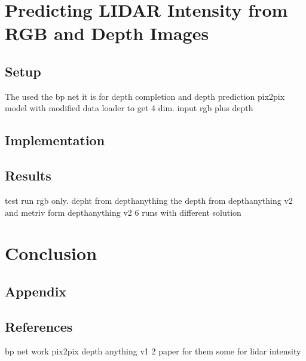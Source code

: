 \chapter{Predicting LIDAR Intensity from RGB and Depth Images}
\section{Setup}
The used the bp net it is for depth completion and depth prediction
pix2pix model with modified data loader to get 4 dim. input rgb plus depth

\section{Implementation}
\section{Results}
test run rgb only. depht from depthanything the depth from depthanything v2 and metriv form depthanything v2 6 runs with different solution
\chapter{Conclusion}
\section{Appendix}

\section{References}
bp net work
pix2pix
depth anything v1 2
paper for them 
some for lidar intensity
